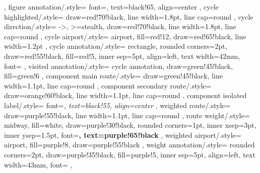 {{    },
    figure annotation/.style={
        font=\sffamily\small,
        text=black!65,
        align=center
    },
    cycle highlighted/.style={
        draw=red!70!black,
        line width=1.8pt,
        line cap=round
    },
    cycle direction/.style={
        ->,
        >=stealth,
        draw=red!70!black,
        line width=1.8pt,
        line cap=round
    },
    cycle airport/.style={
        airport,
        fill=red!12,
        draw=red!65!black,
        line width=1.2pt
    },
    cycle annotation/.style={
        rectangle,
        rounded corners=2pt,
        draw=red!55!black,
        fill=red!5,
        inner sep=5pt,
        align=left,
        text width=42mm,
        font=\sffamily\small
    },
    visited annotation/.style={
        cycle annotation,
        draw=green!45!black,
        fill=green!6
    },
    component main route/.style={
    draw=green!45!black,
    line width=1.1pt,
    line cap=round
    },
    component secondary route/.style={
        draw=orange!60!black,
        line width=1.1pt,
        line cap=round
    },
    component isolated label/.style={
        font=\sffamily\scriptsize\itshape,
        text=black!55,
        align=center
    },
    weighted route/.style={
    draw=purple!55!black,
    line width=1.1pt,
    line cap=round
    },
    route weight/.style={
        midway,
        fill=white,
        draw=purple!30!black,
        rounded corners=1pt,
        inner xsep=3pt,
        inner ysep=1.5pt,
        font=\sffamily\scriptsize\bfseries,
        text=purple!65!black
    },
    weighted airport/.style={
        airport,
        fill=purple!8,
        draw=purple!55!black
    },
    weight annotation/.style={
        rounded corners=2pt,
        draw=purple!35!black,
        fill=purple!5,
        inner sep=5pt,
        align=left,
        text width=43mm,
        font=\sffamily\small
    },
}